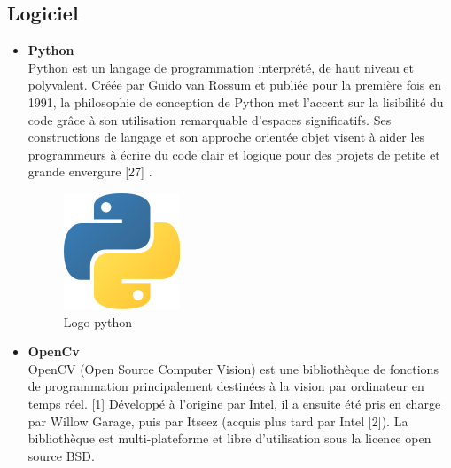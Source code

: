 \documentclass[12pt]{article}
\begin{document}
\subsection{Logiciel}
\begin{itemize}
	\item \textbf{Python}\\
	Python est un langage de programmation interprété, de haut niveau et polyvalent. Créée par Guido van Rossum et publiée pour la première fois en 1991, la philosophie de conception de Python met l'accent sur la lisibilité du code grâce à son utilisation remarquable d'espaces significatifs. Ses constructions de langage et son approche orientée objet visent à aider les programmeurs à écrire du code clair et logique pour des projets de petite et grande envergure [27] .\\
	\newpage
	\begin{figure}[h]
		\centering
		\includegraphics[scale=1]{img-Chapiter-3/pyth.png}
		\caption{Logo python}
	\end{figure}
	
	\item \textbf{OpenCv}\\
	OpenCV (Open Source Computer Vision) est une bibliothèque de fonctions de programmation principalement destinées à la vision par ordinateur en temps réel. [1] Développé à l'origine par Intel, il a ensuite été pris en charge par Willow Garage, puis par Itseez (acquis plus tard par Intel [2]). La bibliothèque est multi-plateforme et libre d'utilisation sous la licence open source BSD.


\end{itemize}
\end{document}
